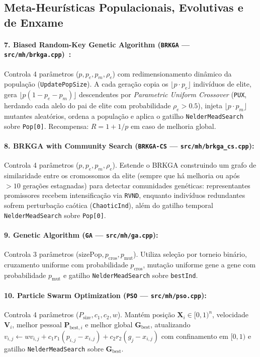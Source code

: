 \documentclass[11pt,a4paper]{article}
\begin{document}
\subsection{Meta-Heurísticas Populacionais, Evolutivas e de Enxame}

\paragraph{7. Biased Random-Key Genetic Algorithm (\texttt{BRKGA} --- \texttt{src/mh/brkga.cpp})~\cite{goncalves2011brkga}:}
Controla 4 parâmetros ($p, p_e, p_m, \rho_e$) com redimensionamento dinâmico da população (\texttt{UpdatePopSize}). A cada geração copia os $\lfloor p \cdot p_e \rfloor$ indivíduos de elite, gera $\lfloor p(1 - p_e - p_m) \rfloor$ descendentes por \emph{Parametric Uniform Crossover} (\texttt{PUX}, herdando cada alelo do pai de elite com probabilidade $\rho_e > 0.5$), injeta $\lfloor p \cdot p_m \rfloor$ mutantes aleatórios, ordena a população e aplica o gatilho \texttt{NelderMeadSearch} sobre \texttt{Pop[0]}. Recompensa: $R = 1 + 1/p$ em caso de melhoria global.

\paragraph{8. BRKGA with Community Search (\texttt{BRKGA-CS} --- \texttt{src/mh/brkga\_cs.cpp}):}
Controla 4 parâmetros ($p, p_e, p_m, \rho_e$). Estende o BRKGA construindo um grafo de similaridade entre os cromossomos da elite (sempre que há melhoria ou após $>10$ gerações estagnadas) para detectar comunidades genéticas: representantes promissores recebem intensificação via \texttt{RVND}, enquanto indivíduos redundantes sofrem perturbação caótica (\texttt{ChaoticInd}), além do gatilho temporal \texttt{NelderMeadSearch} sobre \texttt{Pop[0]}.

\paragraph{9. Genetic Algorithm (\texttt{GA} --- \texttt{src/mh/ga.cpp}):}
Controla 3 parâmetros ($\text{sizePop}, p_{\text{cros}}, p_{\text{mut}}$). Utiliza seleção por torneio binário, cruzamento uniforme com probabilidade $p_{\text{cros}}$, mutação uniforme gene a gene com probabilidade $p_{\text{mut}}$ e gatilho \texttt{NelderMeadSearch} sobre \texttt{bestInd}.

\paragraph{10. Particle Swarm Optimization (\texttt{PSO} --- \texttt{src/mh/pso.cpp}):}
Controla 4 parâmetros ($P_{\text{size}}, c_1, c_2, w$). Mantém posição $\mathbf{X}_i \in [0,1)^n$, velocidade $\mathbf{V}_i$, melhor pessoal $\mathbf{P}_{\text{best},i}$ e melhor global $\mathbf{G}_{\text{best}}$, atualizando $v_{i,j} \leftarrow w v_{i,j} + c_1 r_1 (p_{i,j} - x_{i,j}) + c_2 r_2 (g_j - x_{i,j})$ com confinamento em $[0,1)$ e gatilho \texttt{NelderMeadSearch} sobre $\mathbf{G}_{\text{best}}$.
\end{document}
